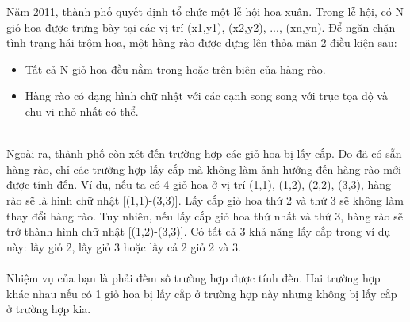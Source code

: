 Năm 2011, thành phố quyết định tổ chức một lễ hội hoa xuân. Trong lễ hội, có N giỏ hoa được trưng bày tại các vị trí (x1,y1), (x2,y2), ..., (xn,yn). Để ngăn chặn tình trạng hái trộm hoa, một hàng rào được dựng lên thỏa mãn 2 điều kiện sau:  
\begin{itemize}
	\item     Tất cả N giỏ hoa đều nằm trong hoặc trên biên của hàng rào.   
\end{itemize}
\begin{itemize}
	\item     Hàng rào có dạng hình chữ nhật với các cạnh song song với trục tọa độ và chu vi nhỏ nhất có thể.   
\end{itemize}


\\   Ngoài ra, thành phố còn xét đến trường hợp các giỏ hoa bị lấy cắp. Do đã có sẵn hàng rào, chỉ các trường hợp lấy cắp mà không làm ảnh hưởng đến hàng rào mới được tính đến. Ví dụ, nếu ta có 4 giỏ hoa ở vị trí (1,1), (1,2), (2,2), (3,3), hàng rào sẽ là hình chữ nhật [(1,1)-(3,3)]. Lấy cắp giỏ hoa thứ 2 và thứ 3 sẽ không làm thay đổi hàng rào. Tuy nhiên, nếu lấy cắp giỏ hoa thứ nhất và thứ 3, hàng rào sẽ trở thành hình chữ nhật [(1,2)-(3,3)]. Có tất cả 3 khả năng lấy cắp trong ví dụ này: lấy giỏ 2, lấy giỏ 3 hoặc lấy cả 2 giỏ 2 và 3.   
\\
\\   Nhiệm vụ của bạn là phải đếm số trường hợp được tính đến. Hai trường hợp khác nhau nếu có 1 giỏ hoa bị lấy cắp ở trường hợp này nhưng không bị lấy cắp ở trường hợp kia.